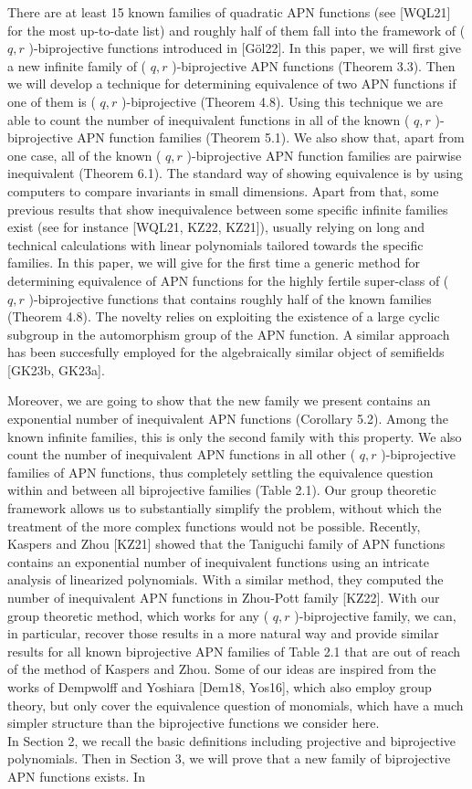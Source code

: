 \documentclass[10pt]{article}
\begin{document}
There are at least 15 known families of quadratic APN functions (see [WQL21] for the most up-to-date list) and roughly half of them fall into the framework of ( $q, r$ )-biprojective functions introduced in [Göl22]. In this paper, we will first give a new infinite family of ( $q, r$ )-biprojective APN functions (Theorem 3.3). Then we will develop a technique for determining equivalence of two APN functions if one of them is ( $q, r$ )-biprojective (Theorem 4.8). Using this technique we are able to count the number of inequivalent functions in all of the known ( $q, r$ )-biprojective APN function families (Theorem 5.1). We also show that, apart from one case, all of the known ( $q, r$ )-biprojective APN function families are pairwise inequivalent (Theorem 6.1). The standard way of showing equivalence is by using computers to compare invariants in small dimensions. Apart from that, some previous results that show inequivalence between some specific infinite families exist (see for instance [WQL21, KZ22, KZ21]), usually relying on long and technical calculations with linear polynomials tailored towards the specific families. In this paper, we will give for the first time a generic method for determining equivalence of APN functions for the highly fertile super-class of ( $q, r$ )-biprojective functions that contains roughly half of the known families (Theorem 4.8). The novelty relies on exploiting the existence of a large cyclic subgroup in the automorphism group of the APN function. A similar approach has been succesfully employed for the algebraically similar object of semifields [GK23b, GK23a].

Moreover, we are going to show that the new family we present contains an exponential number of inequivalent APN functions (Corollary 5.2). Among the known infinite families, this is only the second family with this property. We also count the number of inequivalent APN functions in all other ( $q, r$ )-biprojective families of APN functions, thus completely settling the equivalence question within and between all biprojective families (Table 2.1). Our group theoretic framework allows us to substantially simplify the problem, without which the treatment of the more complex functions would not be possible. Recently, Kaspers and Zhou [KZ21] showed that the Taniguchi family of APN functions contains an exponential number of inequivalent functions using an intricate analysis of linearized polynomials. With a similar method, they computed the number of inequivalent APN functions in Zhou-Pott family [KZ22]. With our group theoretic method, which works for any ( $q, r$ )-biprojective family, we can, in particular, recover those results in a more natural way and provide similar results for all known biprojective APN families of Table 2.1 that are out of reach of the method of Kaspers and Zhou. Some of our ideas are inspired from the works of Dempwolff and Yoshiara [Dem18, Yos16], which also employ group theory, but only cover the equivalence question of monomials, which have a much simpler structure than the biprojective functions we consider here.\\
In Section 2, we recall the basic definitions including projective and biprojective polynomials. Then in Section 3, we will prove that a new family of biprojective APN functions exists. In
\end{document}
